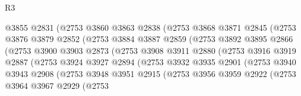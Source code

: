 \begin{lexlean}{R3}
\begin{coremodule}
                        @3855
                        @2831
                        (@2753
                          @3860
                          @3863
                          @2838
                          (@2753
                            @3868
                            @3871
                            @2845
                            (@2753
                              @3876
                              @3879
                              @2852
                              (@2753
                                @3884
                                @3887
                                @2859
                                (@2753
                                  @3892
                                  @3895
                                  @2866
                                  (@2753
                                    @3900
                                    @3903
                                    @2873
                                    (@2753
                                      @3908
                                      @3911
                                      @2880
                                      (@2753
                                        @3916
                                        @3919
                                        @2887
                                        (@2753
                                          @3924
                                          @3927
                                          @2894
                                          (@2753
                                            @3932
                                            @3935
                                            @2901
                                            (@2753
                                              @3940
                                              @3943
                                              @2908
                                              (@2753
                                                @3948
                                                @3951
                                                @2915
                                                (@2753
                                                  @3956
                                                  @3959
                                                  @2922
                                                  (@2753
                                                    @3964
                                                    @3967
                                                    @2929
                                                    (@2753

\end{coremodule}
\end{lexlean}
